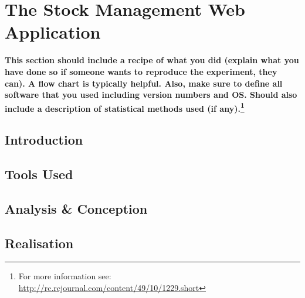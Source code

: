 \chapter{The Stock Management Web Application} %
\label{chap:app}
\textbf{This section should include a recipe of what you did (explain what you have done so if someone wants to reproduce the experiment, they can).  A flow chart is typically helpful.  Also, make sure to define all software that you used including version numbers and OS.  Should also include a description of statistical methods used (if any).\footnote{For more information see: \url{http://rc.rcjournal.com/content/49/10/1229.short}}}

\section{Introduction}%
\section{Tools Used}
\section{Analysis \& Conception}
\section{Realisation}%
\blindtext